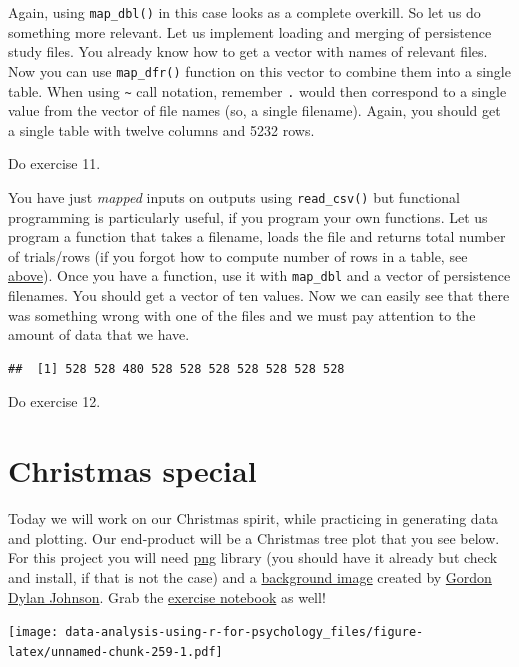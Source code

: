 \documentclass[
]{book}
\begin{document}
Again, using \texttt{map\_dbl()} in this case looks as a complete overkill. So let us do something more relevant. Let us implement loading and merging of persistence study files. You already know how to get a vector with names of relevant files. Now you can use \texttt{map\_dfr()} function on this vector to combine them into a single table. When using \texttt{\textasciitilde{}} call notation, remember \texttt{.} would then correspond to a single value from the vector of file names (so, a single filename). Again, you should get a single table with twelve columns and 5232 rows.

Do exercise 11.

You have just \emph{mapped} inputs on outputs using \texttt{read\_csv()} but functional programming is particularly useful, if you program your own functions. Let us program a function that takes a filename, loads the file and returns total number of trials/rows (if you forgot how to compute number of rows in a table, see \protect\hyperlink{forloop}{above}). Once you have a function, use it with \texttt{map\_dbl} and a vector of persistence filenames. You should get a vector of ten values. Now we can easily see that there was something wrong with one of the files and we must pay attention to the amount of data that we have.

\begin{verbatim}
##  [1] 528 528 480 528 528 528 528 528 528 528
\end{verbatim}

Do exercise 12.

\hypertarget{christmas-special}{%
\chapter{Christmas special}\label{christmas-special}}

Today we will work on our Christmas spirit, while practicing in generating data and plotting. Our end-product will be a Christmas tree plot that you see below. For this project you will need \href{https://cran.r-project.org/package=png}{png} library (you should have it already but check and install, if that is not the case) and a \href{images/christmas-background.png}{background image} created by \href{https://openclipart.org/artist/GDJ}{Gordon Dylan Johnson}. Grab the \href{notebooks/Seminar\%2010\%20-\%20Christmas\%20special.Rmd}{exercise notebook} as well!

\texttt{[image: data-analysis-using-r-for-psychology\_files/figure-latex/unnamed-chunk-259-1.pdf]}
\end{document}
